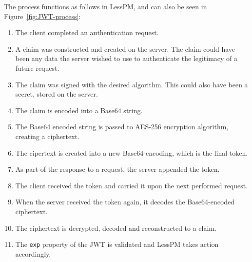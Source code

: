The process functions as follows in LessPM, and can also be seen in
Figure~\ref{fig:JWT-process}:
\begin{enumerate}
  \item The client completed an authentication request.
  \item A claim was constructed and created on the server.
  The claim could have been any data the server wished to use to authenticate
  the legitimacy of a future request.
  \item The claim was signed with the desired algorithm.
  This could also have been a secret, stored on the server.
  \item The claim is encoded into a Base64 string.
  \item The Base64 encoded string is passed to AES-256 encryption algorithm,
  creating a ciphertext.
  \item The cipertext is created into a new Base64-encoding, which is the
  final token.
  \item As part of the response to a request, the server appended the
  token.
  \item The client received the token and carried it upon the next performed
  request.
  \item When the server received the token again, it decodes the
  Base64-encoded ciphertext.
  \item The ciphertext is decrypted, decoded and reconstructed to a claim.
  \item The \texttt{exp} property of the JWT is validated and LessPM takes
  action accordingly.
\end{enumerate}

